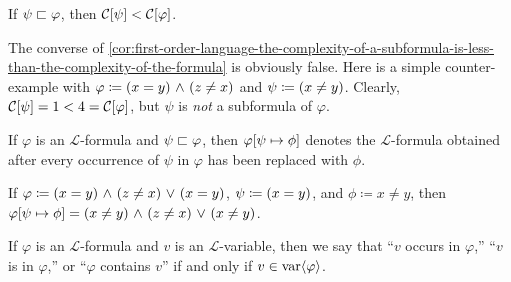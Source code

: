 \begin{cor}
     \label{cor:first-order-language-the-complexity-of-a-subformula-is-less-than-the-complexity-of-the-formula}
    If \( \psi  \sqsubset  \varphi \), then \( \folcomplexityofformula{\psi} < \folcomplexityofformula{\varphi} \).
\end{cor}

\begin{rem}
    The converse of \cref{cor:first-order-language-the-complexity-of-a-subformula-is-less-than-the-complexity-of-the-formula} is obviously false.
    Here is a simple counter-example with \( \varphi \coloneq \mleft( x = y \mright) \,\,{\land}\,\, \mleft( z \neq x \mright)  \) and \( \psi \coloneq \mleft( x \neq y \mright) \).
    Clearly, \( \folcomplexityofformula{\psi} = 1 < 4 = \folcomplexityofformula{\varphi} \), but \( \psi \) is \emph{not} a subformula of \( \varphi \).
\end{rem}

\begin{notation}
    If \( \varphi \) is an \( \mathcal{L} \)-formula and \( \psi  \sqsubset  \varphi \), then \( \folsubformulasubstitution{\varphi}{\psi}{\phi} \)
    denotes the \( \mathcal{L} \)-formula obtained after every occurrence of \( \psi \) in \( \varphi \)
    has been replaced with \( \phi \).
\end{notation}

\begin{eg}
    If \( \varphi \coloneq \mleft( x = y \mright) \,\,{\land}\,\, \mleft( z \neq x \mright) \,\,{\lor}\,\, \mleft( x = y \mright) \),
    \( \psi \coloneq \mleft( x = y \mright) \), and
    \( \phi \coloneq x \neq y \), then \( \folsubformulasubstitution{\varphi}{\psi}{\phi} = \mleft( x \neq y \mright) \,\,{\land}\,\, \mleft( z \neq x \mright) \,\,{\lor}\,\, \mleft( x \neq y \mright) \).
\end{eg}

\begin{dfn}
     \label{dfn:first-order-language-variable-occurrence-in-formulas}
    If \( \varphi \) is an \( \mathcal{L} \)-formula and \( v \) is an \( \mathcal{L} \)-variable, then we say that ``\( v \) occurs in \( \varphi \),'' 
    ``\( v \) is in \( \varphi \),'' or ``\( \varphi \) contains \( v \)'' if and only if \( v \in \operatorname{var} \langle\varphi\rangle \).
\end{dfn}

